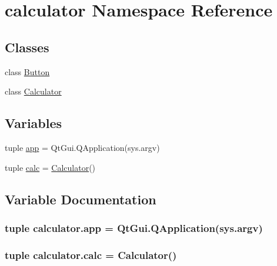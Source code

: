 \hypertarget{namespacecalculator}{}\section{calculator Namespace Reference}
\label{namespacecalculator}
\subsection*{Classes}
\begin{DoxyCompactItemize}
\item 
class \hyperlink{classcalculator_1_1Button}{Button}
\item 
class \hyperlink{classcalculator_1_1Calculator}{Calculator}
\end{DoxyCompactItemize}
\subsection*{Variables}
\begin{DoxyCompactItemize}
\item 
tuple \hyperlink{namespacecalculator_a0bde3d13142013b9414cd4d78fd05878}{app} = Qt\+Gui.\+Q\+Application(sys.\+argv)
\item 
tuple \hyperlink{namespacecalculator_a504d7a91e7db948533fa39d8ea88efa5}{calc} = \hyperlink{classcalculator_1_1Calculator}{Calculator}()
\end{DoxyCompactItemize}


\subsection{Variable Documentation}
\hypertarget{namespacecalculator_a0bde3d13142013b9414cd4d78fd05878}{}
\subsubsection[{app}]{\setlength{\rightskip}{0pt plus 5cm}tuple calculator.\+app = Qt\+Gui.\+Q\+Application(sys.\+argv)}\label{namespacecalculator_a0bde3d13142013b9414cd4d78fd05878}
\hypertarget{namespacecalculator_a504d7a91e7db948533fa39d8ea88efa5}{}
\subsubsection[{calc}]{\setlength{\rightskip}{0pt plus 5cm}tuple calculator.\+calc = {\bf Calculator}()}\label{namespacecalculator_a504d7a91e7db948533fa39d8ea88efa5}

